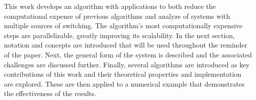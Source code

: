 This work develops an algorithm with applications to both reduce the computational expense of previous algorithms and analyze of systems with multiple sources of switching. The algorithm's most computationally expensive steps are parallelizable, greatly improving its scalability. In the next section, notation and concepts are introduced that will be used throughout the reminder of the paper. Next, the general form of the system is described and the associated challenges are discussed further. Finally, several algorithms are introduced as key contributions of this work and their theoretical properties and implementation are explored. These are then applied to a numerical example that demonstrates the effectiveness of the results. 